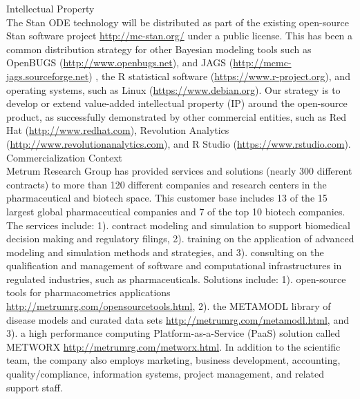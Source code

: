 \noindent
{\sc Intellectual Property}
\\[2pt]
The Stan ODE technology will be distributed as part of the existing
open-source Stan software project \url{http://mc-stan.org/} under a
public license. This has been a common distribution strategy for other
Bayesian modeling tools such as OpenBUGS
(\url{http://www.openbugs.net}), and JAGS
(\url{http://mcmc-jags.sourceforge.net}) , the R statistical software
(\url{https://www.r-project.org}), and operating systems, such as
Linux (\url{https://www.debian.org}). Our strategy is to develop or
extend value-added intellectual property (IP) around the open-source
product, as successfully demonstrated by other commercial entities,
such as Red Hat (\url{http://www.redhat.com}), Revolution Analytics
(\url{http://www.revolutionanalytics.com}), and R Studio
(\url{https://www.rstudio.com}).\\ 

\noindent
{\sc Commercialization Context}
\\[2pt]
Metrum Research Group has provided services and solutions (nearly 300
different contracts) to more than 120 different companies and research
centers in the pharmaceutical and biotech space. This customer base
includes 13 of the 15 largest global pharmaceutical companies and 7 of
the top 10 biotech companies. The services include: 1). contract
modeling and simulation to support biomedical decision making and
regulatory filings, 2). training on the application of advanced
modeling and simulation methods and strategies, and 3). consulting on
the qualification and management of software and computational
infrastructures in regulated industries, such as
pharmaceuticals. Solutions include: 1). open-source tools for
pharmacometrics applications
\url{http://metrumrg.com/opensourcetools.html}, 2). the METAMODL
library of disease models and curated data sets
\url{http://metrumrg.com/metamodl.html}, and 3). a high performance
computing Platform-as-a-Service (PaaS) solution called METWORX
\url{http://metrumrg.com/metworx.html}. In addition to the scientific
team, the company also employs marketing, business development,
accounting, quality/compliance, information systems, project
management, and related support staff.\\ 

